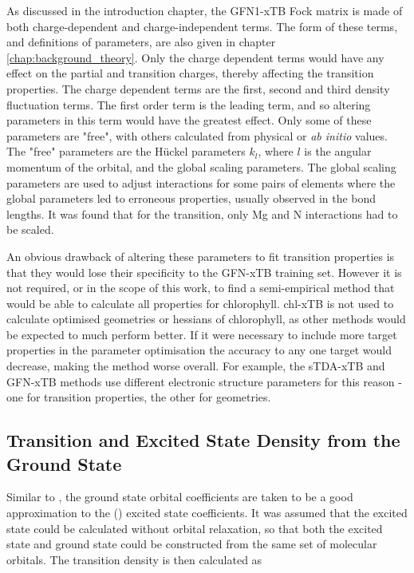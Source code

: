 As discussed in the introduction chapter, the GFN1-xTB Fock matrix is made of both
charge-dependent and charge-independent terms. The form of these terms, and definitions
of parameters, are also given in chapter \ref{chap:background_theory}. Only the
charge dependent terms would have any effect on the partial and transition charges,
thereby affecting the transition properties. The charge dependent terms are the 
first, second and third density fluctuation terms. The first order term is the leading 
term, and so altering parameters in this term would have the greatest effect. Only
some of these parameters are "free", with others calculated from physical or \emph{ab initio}
values. The "free" parameters are the H{\"u}ckel parameters $k_l$, where $l$ is
the angular momentum of the orbital, and the global scaling parameters. The global
scaling parameters are used to adjust interactions for some pairs of elements where
the global parameters led to erroneous properties, usually observed in the bond
lengths. It was found that for the \Qy transition, only Mg and N interactions had
to be scaled.

An obvious drawback of altering these parameters to fit transition properties is
that they would lose their specificity to the GFN-xTB training set. However it is
not required, or in the scope of this work, to find a semi-empirical method that 
would be able to calculate all properties for chlorophyll. chl-xTB is not used to 
calculate optimised geometries or hessians of chlorophyll, as other methods would 
be expected to much perform better. If it were necessary to include more target properties
in the parameter optimisation the accuracy to any one target would decrease, making
the method worse overall. For example, the sTDA-xTB and GFN-xTB methods use different
electronic structure parameters for this reason - one for transition properties, 
the other for geometries.

\subsection{Transition and Excited State Density from the Ground State}
\label{subsec:trans_excited_densities}

Similar to \dscf, the ground state orbital coefficients are taken to be a good approximation
to the (\Qy) excited state coefficients. It was assumed that the excited state could
be calculated without orbital relaxation, so that both the excited state and ground
state could be constructed from the same set of molecular orbitals. The transition
density is then calculated as

